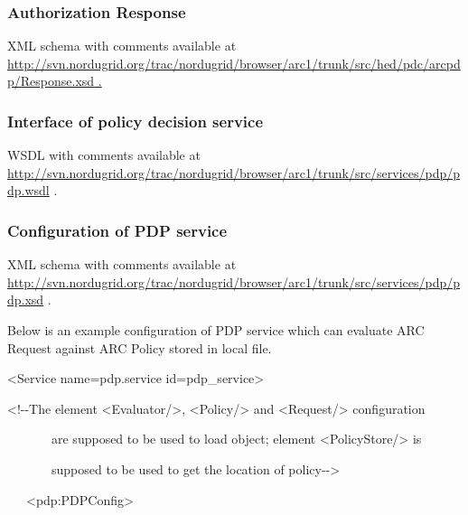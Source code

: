 \documentclass[a4paper]{article}
\newcommand\textstyleInternetlink[1]{\textcolor[rgb]{0.0,0.0,0.5019608}{#1}}
\begin{document}
\subsubsection{Authorization Response}
{\upshape\color{black}
XML schema with comments available at
\href{http://svn.nordugrid.org/trac/nordugrid/browser/arc1/trunk/src/hed/pdc/arcpdp/Request.xsd}{\textstyleInternetlink{http://svn.nordugrid.org/trac/nordugrid/browser/arc1/trunk/src/hed/pdc/arcpdp/Response.xsd}}\href{http://svn.nordugrid.org/trac/nordugrid/browser/arc1/trunk/src/hed/pdc/arcpdp/Policy.xsd}{\textstyleInternetlink{
.}}}

\subsubsection[Interface of policy decision service]{Interface of policy
decision service}
{\upshape\color{black}
WSDL with comments available at
\url{http://svn.nordugrid.org/trac/nordugrid/browser/arc1/trunk/src/services/pdp/pdp.wsdl}
.}

\subsubsection{Configuration of PDP service}
{\upshape\color{black}
XML schema with comments available at
\url{http://svn.nordugrid.org/trac/nordugrid/browser/arc1/trunk/src/services/pdp/pdp.xsd}
.}

{\upshape\color{black}
Below is an example configuration of PDP service which can evaluate ARC
Request against ARC Policy stored in local file.}

{\ttfamily\color{black}
{\textless}Service name={\textquotedbl}pdp.service{\textquotedbl}
id={\textquotedbl}pdp\_service{\textquotedbl}{\textgreater}}

{\ttfamily\color{black}
{\textless}!-{}-The element {\textless}Evaluator/{\textgreater},
{\textless}Policy/{\textgreater} and {\textless}Request/{\textgreater}
configuration}

{\ttfamily\color{black}
\ \ \ \ \ \ \ are supposed to be used to load object; element
{\textless}PolicyStore/{\textgreater} is}

{\ttfamily\color{black}
\ \ \ \ \ \ \ supposed to be used to get the location of
policy-{}-{\textgreater}}

{\ttfamily\color{black}
\ \ \ {\textless}pdp:PDPConfig{\textgreater}}
\end{document}
